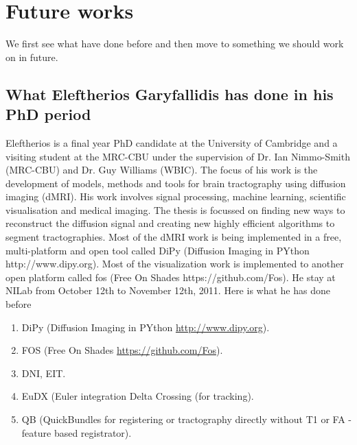 

\section{Future works}
We first see what have done before and then move to something we should work on in future.

\subsection{What Eleftherios Garyfallidis has done in his PhD period}

Eleftherios is a final year PhD candidate at the University of Cambridge and a visiting student at the MRC-CBU under the supervision of Dr. Ian Nimmo-Smith (MRC-CBU) and Dr. Guy Williams (WBIC). The focus of his work is the development of models, methods and tools for brain tractography using diffusion imaging (dMRI). His work involves signal processing, machine learning, scientific visualisation and medical imaging. The thesis is focussed on finding new ways to reconstruct the diffusion signal and creating new highly efficient algorithms to segment tractographies. Most of the dMRI work is being implemented in a free, multi-platform and open tool called DiPy (Diffusion Imaging in PYthon http://www.dipy.org). Most of the visualization work is implemented to another open platform called fos (Free On Shades https://github.com/Fos). He stay at NILab from October 12th to November 12th, 2011. Here is what he has done before
\begin{enumerate}
\item DiPy (Diffusion Imaging in PYthon \url{http://www.dipy.org}).
\item FOS (Free On Shades \url{https://github.com/Fos}).
\item DNI, EIT.
\item EuDX (Euler integration Delta Crossing (for tracking).
\item QB (QuickBundles for registering or tractography directly without T1 or FA - feature based registrator).
\end{enumerate}

